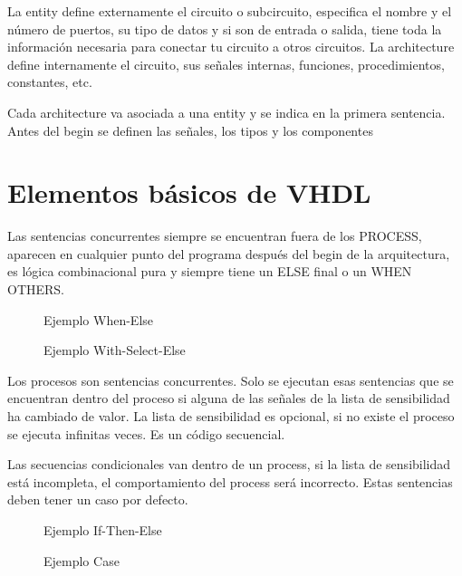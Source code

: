 La entity define externamente el circuito o subcircuito,  especifica el nombre y el número de puertos, su tipo de datos y si son de entrada o salida, tiene toda la información necesaria para conectar tu circuito a otros circuitos.
La architecture define internamente el circuito, sus señales internas, funciones, procedimientos, constantes, etc.


Cada architecture va asociada a una entity y se indica en la primera sentencia. Antes del begin se definen las señales, los tipos y los componentes

\begin{figure}[H]
	\centering
	
\end{figure}

\section{Elementos básicos de VHDL}

Las sentencias concurrentes siempre se encuentran fuera de los PROCESS, aparecen en cualquier punto del programa después del begin de la arquitectura,  es lógica combinacional pura y siempre tiene un ELSE final o un WHEN OTHERS.
\newpage
\begin{multicols}{2}
	\begin{figure}[H]
		\centering
		
		\caption{Ejemplo When-Else}
	\end{figure}
	\vfill
	\begin{figure}[H]
		\centering
		
		\caption{Ejemplo With-Select-Else}
	\end{figure}
\end{multicols}


Los procesos son sentencias concurrentes. Solo se ejecutan esas sentencias que se encuentran dentro del proceso si alguna de las señales de la lista de sensibilidad ha cambiado de valor. La lista de sensibilidad es opcional, si no existe el proceso se ejecuta infinitas veces. Es un código secuencial.
\begin{figure}[H]
	\centering
	
\end{figure}

Las secuencias condicionales van dentro de un process, si la lista de sensibilidad está incompleta, el comportamiento del process será incorrecto. Estas sentencias deben tener un caso por defecto.
\begin{multicols}{2}
	\begin{figure}[H]
		\centering
		
		\caption{Ejemplo If-Then-Else}
	\end{figure}
	\vfill
	\begin{figure}[H]
		\centering
		
		\caption{Ejemplo Case}
	\end{figure}
\end{multicols}

